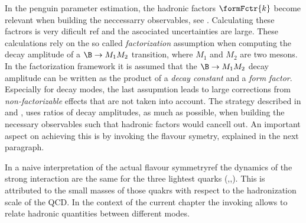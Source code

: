 In the penguin parameter estimation, the hadronic factors $\formFctr{k}$ become relevant when building
the neccessarry observables, see . Calculating these factrors is very dificult{\color{red} ref}
and the ascociated uncertainties are large. These calculations rely on the so called {\it factorization} assumption
when computing the decay amplitude of a $\B\to M_1M_2$ transition, where $M_1$ and $M_2$ are two mesons.
In the factorization framework it is assumed that the $\B\to M_1M_2$ decay amplitude can be written as
the product of a {\it decay constant} and a {\it form factor}. Especially for \BJpsiX decay modes, the
last assupmtion leads to large corrections from {\it non-factorizable} effects that are not taken into
account. The strategy described in  and , uses
ratios of decay amplitudes, as much as possible, when building the necessary observables such that hadronic
factors would cancell out. An important aspect on achieving this is by invoking the \grpsuthree flavour symetry,
explained in the next paragraph.

In a naive interpretation of the actual \grpsuthree flavour symmetry{ref} the dynamics of the strong
interaction are the same for the three lightest quarks (\uquark,\dquark,\squark). This is attributed
to the small masses of those quakrs with respect to the hadronization scale of the QCD.
In the context of the current chapter the invoking \grpsuthree allows to relate hadronic quantities
between different \BJpsiX modes.

%
%

